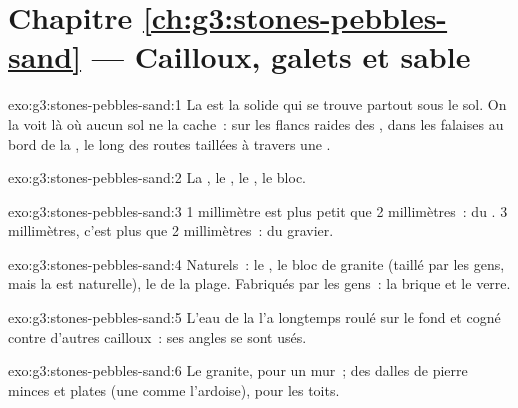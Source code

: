 \section*{Chapitre \ref{ch:g3:stones-pebbles-sand} --- Cailloux, galets et sable}

\begin{solution}{exo:g3:stones-pebbles-sand:1}
La  est la  solide qui se trouve partout sous le sol.
On la voit là où aucun sol ne la cache~: sur les flancs raides des
, dans les falaises au bord de la , le long des routes
taillées à travers une .
\end{solution}

\begin{solution}{exo:g3:stones-pebbles-sand:2}
La , le , le , le bloc.
\end{solution}

\begin{solution}{exo:g3:stones-pebbles-sand:3}
1 millimètre est plus petit que 2 millimètres~: du . 3 millimètres,
c'est plus que 2 millimètres~: du gravier.
\end{solution}

\begin{solution}{exo:g3:stones-pebbles-sand:4}
Naturels~: le , le bloc de granite (taillé par les gens, mais la 
est naturelle), le  de la plage. Fabriqués par les gens~: la brique
et le verre.
\end{solution}

\begin{solution}{exo:g3:stones-pebbles-sand:5}
L'eau de la  l'a longtemps roulé sur le fond et cogné contre
d'autres cailloux~: ses angles se sont usés.
\end{solution}

\begin{solution}{exo:g3:stones-pebbles-sand:6}
Le granite, pour un mur~; des dalles de pierre minces et plates (une  comme l'ardoise), pour les toits.
\end{solution}

